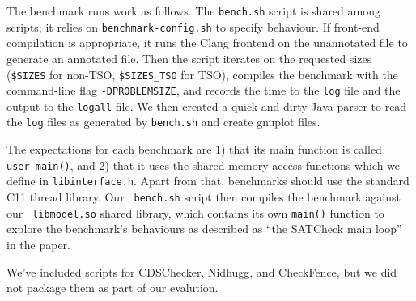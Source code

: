 \documentclass[10pt,nocopyrightspace,preprint]{sigplanconf}
\begin{document}
The benchmark runs work as follows. The {\tt bench.sh} script is shared among
scripts; it relies on {\tt benchmark-config.sh} to specify behaviour. 
If front-end compilation is appropriate, it runs the Clang frontend on the
unannotated file to generate an annotated file. Then the script iterates on the
requested sizes ({\tt \$SIZES} for non-TSO, {\tt \$SIZES\_TSO} for TSO),
compiles the benchmark with the command-line flag {\tt -DPROBLEMSIZE}, and records
the time to the {\tt log} file and the output to the {\tt logall} file. We then created
a quick and dirty Java parser to read the {\tt log} files as generated by
{\tt bench.sh} and create gnuplot files.

The expectations for each benchmark are 1) that its main function is
called {\tt user\_main()}, and 2) that it uses the shared memory
access functions which we define in {\tt libinterface.h}. Apart from
that, benchmarks should use the standard C11 thread library.  Our {\tt
  bench.sh} script then compiles the benchmark against our {\tt
  libmodel.so} shared library, which contains its own {\tt main()}
function to explore the benchmark's behaviours as described as ``the SATCheck main loop'' in the paper.

We've included scripts for CDSChecker, Nidhugg, and CheckFence, but we did 
not package them as part of our evalution.
\end{document}
